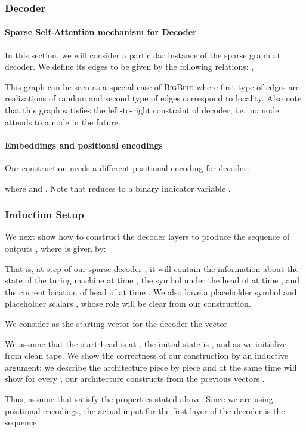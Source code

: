 \documentclass{article}
\newcommand{\bigb}{\textsc{BigBird}\xspace}
\begin{document}
\subsubsection*{Decoder}
\paragraph{Sparse Self-Attention mechanism for Decoder}
In this section, we will consider a particular instance of the sparse graph  at decoder.
We define its edges to be given by the following relations:
,  


This graph can be seen as a special case of \bigb where first type 
of edges are realizations of random and second type of edges correspond to locality.
Also note that this graph satisfies the left-to-right constraint of 
decoder, i.e.~no node attends to a node in the future.


\paragraph{Embeddings and positional encodings}
Our construction needs a different positional encoding  for decoder: 

where  and . Note that  reduces to a binary indicator variable .


\subsubsection*{Induction Setup}
We next show how to construct the decoder layers to produce the sequence of outputs ,
where  is given by:

That is, at step  of our sparse decoder , it will contain the information about the state of the turing machine  at time , the symbol under the head of  at time , and the current location of head of  at time .
We also have a placeholder symbol  and placeholder scalars , whose role will be clear from our construction.

We consider as the starting vector for the decoder the vector

We assume that the start head is at , the initial state is , and  as we initialize from clean tape.
We show the correctness of our construction by an inductive argument:
we describe the architecture piece by piece and at the same time will show for every  
, our architecture constructs  from the previous vectors 
.

Thus, assume that  satisfy the properties stated above. 
Since we are using positional encodings, 
the actual input for the first layer of the decoder is the sequence
\end{document}
